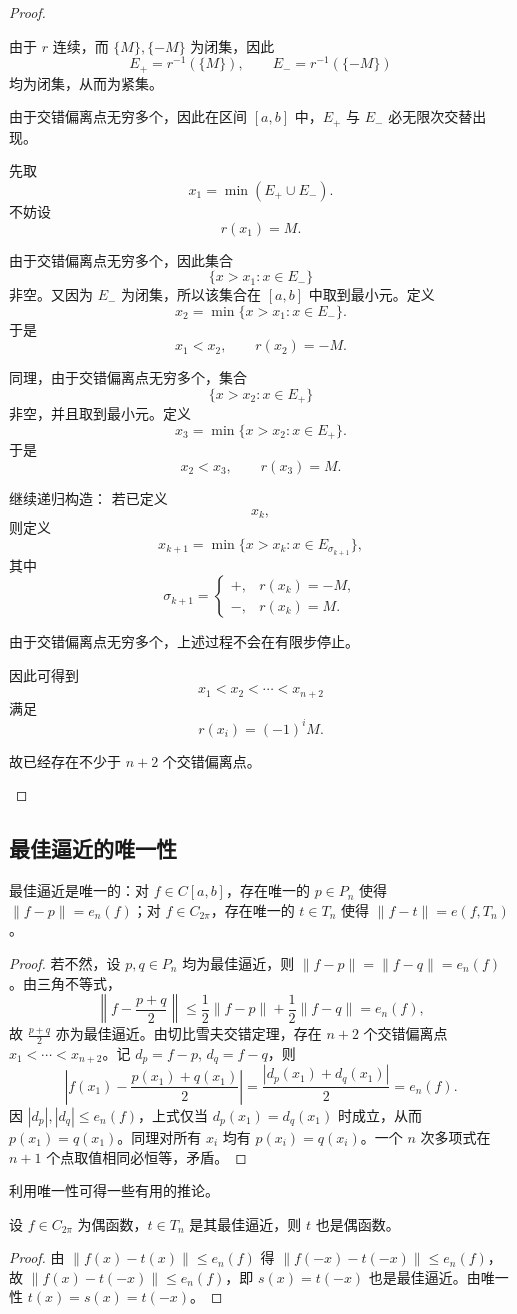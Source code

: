 \begin{proof}
\begin{enumerate}
由于 $r$ 连续，而 $\{M\},\{-M\}$ 为闭集，因此
$$
E_+=r^{-1}(\{M\}),\qquad
E_-=r^{-1}(\{-M\})
$$
均为闭集，从而为紧集。

由于交错偏离点无穷多个，因此在区间 $[a,b]$ 中，$E_+$ 与 $E_-$ 必无限次交替出现。

先取
$$
x_1=\min(E_+\cup E_-).
$$
不妨设
$$
r(x_1)=M.
$$

由于交错偏离点无穷多个，因此集合
$$
\{x>x_1:x\in E_-\}
$$
非空。又因为 $E_-$ 为闭集，所以该集合在 $[a,b]$ 中取到最小元。定义
$$
x_2=\min\{x>x_1:x\in E_-\}.
$$
于是
$$
x_1<x_2,\qquad r(x_2)=-M.
$$

同理，由于交错偏离点无穷多个，集合
$$
\{x>x_2:x\in E_+\}
$$
非空，并且取到最小元。定义
$$
x_3=\min\{x>x_2:x\in E_+\}.
$$
于是
$$
x_2<x_3,\qquad r(x_3)=M.
$$

继续递归构造：
若已定义
$$
x_k,
$$
则定义
$$
x_{k+1}
=
\min\{x>x_k:x\in E_{\sigma_{k+1}}\},
$$
其中
$$
\sigma_{k+1}=
\begin{cases}
+,& r(x_k)=-M,\\
-,& r(x_k)=M.
\end{cases}
$$

由于交错偏离点无穷多个，上述过程不会在有限步停止。

因此可得到
$$
x_1<x_2<\cdots<x_{n+2}
$$
满足
$$
r(x_i)=(-1)^iM.
$$

故已经存在不少于 $n+2$ 个交错偏离点。
\end{enumerate}
\end{proof}

\subsection{最佳逼近的唯一性}
\begin{theorem}
最佳逼近是唯一的：对 $f\in C[a,b]$，存在唯一的 $p\in P_n$ 使得 $\|f-p\| = e_n(f)$；对 $f\in C_{2\pi}$，存在唯一的 $t\in T_n$ 使得 $\|f-t\| = e(f,T_n)$。
\end{theorem}

\begin{proof}
若不然，设 $p,q\in P_n$ 均为最佳逼近，则 $\|f-p\| = \|f-q\| = e_n(f)$。由三角不等式，
\[
\left\|f - \frac{p+q}{2}\right\|  \leqslant \frac12\|f-p\| + \frac12\|f-q\| = e_n(f),
\]
故 $\frac{p+q}{2}$ 亦为最佳逼近。由切比雪夫交错定理，存在 $n+2$ 个交错偏离点 $x_1<\cdots<x_{n+2}$。记 $d_p = f-p$, $d_q = f-q$，则
\[
\left|f(x_1) - \frac{p(x_1)+q(x_1)}{2}\right| = \frac{|d_p(x_1)+d_q(x_1)|}{2} = e_n(f).
\]
因 $|d_p|,|d_q| \leqslant e_n(f)$，上式仅当 $d_p(x_1)=d_q(x_1)$ 时成立，从而 $p(x_1)=q(x_1)$。同理对所有 $x_i$ 均有 $p(x_i)=q(x_i)$。一个 $n$ 次多项式在 $n+1$ 个点取值相同必恒等，矛盾。
\end{proof}

利用唯一性可得一些有用的推论。
\begin{theorem}
设 $f\in C_{2\pi}$ 为偶函数，$t\in T_n$ 是其最佳逼近，则 $t$ 也是偶函数。
\end{theorem}
\begin{proof}
由 $\|f(x)-t(x)\| \leqslant e_n(f)$ 得 $\|f(-x)-t(-x)\| \leqslant e_n(f)$，故 $\|f(x)-t(-x)\| \leqslant e_n(f)$，即 $s(x)=t(-x)$ 也是最佳逼近。由唯一性 $t(x)=s(x)=t(-x)$。
\end{proof}